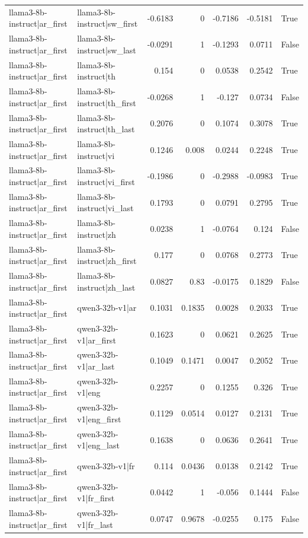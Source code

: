 \begin{table}
\begin{tabular}{l l r r r r l}
llama3-8b-instruct|ar_first & llama3-8b-instruct|sw_first & -0.6183 & 0 & -0.7186 & -0.5181 & True \\
llama3-8b-instruct|ar_first & llama3-8b-instruct|sw_last & -0.0291 & 1 & -0.1293 & 0.0711 & False \\
llama3-8b-instruct|ar_first & llama3-8b-instruct|th & 0.154 & 0 & 0.0538 & 0.2542 & True \\
llama3-8b-instruct|ar_first & llama3-8b-instruct|th_first & -0.0268 & 1 & -0.127 & 0.0734 & False \\
llama3-8b-instruct|ar_first & llama3-8b-instruct|th_last & 0.2076 & 0 & 0.1074 & 0.3078 & True \\
llama3-8b-instruct|ar_first & llama3-8b-instruct|vi & 0.1246 & 0.008 & 0.0244 & 0.2248 & True \\
llama3-8b-instruct|ar_first & llama3-8b-instruct|vi_first & -0.1986 & 0 & -0.2988 & -0.0983 & True \\
llama3-8b-instruct|ar_first & llama3-8b-instruct|vi_last & 0.1793 & 0 & 0.0791 & 0.2795 & True \\
llama3-8b-instruct|ar_first & llama3-8b-instruct|zh & 0.0238 & 1 & -0.0764 & 0.124 & False \\
llama3-8b-instruct|ar_first & llama3-8b-instruct|zh_first & 0.177 & 0 & 0.0768 & 0.2773 & True \\
llama3-8b-instruct|ar_first & llama3-8b-instruct|zh_last & 0.0827 & 0.83 & -0.0175 & 0.1829 & False \\
llama3-8b-instruct|ar_first & qwen3-32b-v1|ar & 0.1031 & 0.1835 & 0.0028 & 0.2033 & True \\
llama3-8b-instruct|ar_first & qwen3-32b-v1|ar_first & 0.1623 & 0 & 0.0621 & 0.2625 & True \\
llama3-8b-instruct|ar_first & qwen3-32b-v1|ar_last & 0.1049 & 0.1471 & 0.0047 & 0.2052 & True \\
llama3-8b-instruct|ar_first & qwen3-32b-v1|eng & 0.2257 & 0 & 0.1255 & 0.326 & True \\
llama3-8b-instruct|ar_first & qwen3-32b-v1|eng_first & 0.1129 & 0.0514 & 0.0127 & 0.2131 & True \\
llama3-8b-instruct|ar_first & qwen3-32b-v1|eng_last & 0.1638 & 0 & 0.0636 & 0.2641 & True \\
llama3-8b-instruct|ar_first & qwen3-32b-v1|fr & 0.114 & 0.0436 & 0.0138 & 0.2142 & True \\
llama3-8b-instruct|ar_first & qwen3-32b-v1|fr_first & 0.0442 & 1 & -0.056 & 0.1444 & False \\
llama3-8b-instruct|ar_first & qwen3-32b-v1|fr_last & 0.0747 & 0.9678 & -0.0255 & 0.175 & False \\

\end{tabular}
\end{table}

